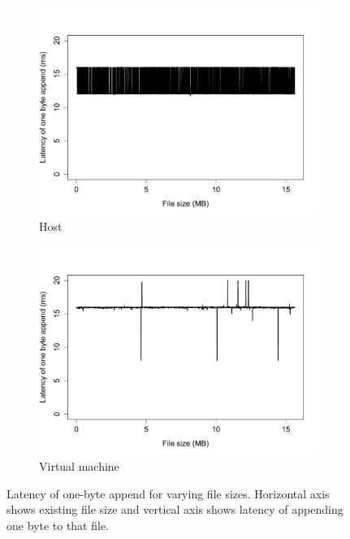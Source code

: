  \begin{figure}[ht!]
    \begin{subfigure}[b]{0.5\textwidth}
		\includegraphics[width=1\textwidth]{./figures/p4_host.pdf}
		\caption{Host}
		\label{fig:p4host}
    \end{subfigure}
    \begin{subfigure}[b]{0.5\textwidth}
		\includegraphics[width=1\textwidth]{./figures/p4_vm.pdf}
		\caption{Virtual machine}
		\label{fig:p4vm}
    \end{subfigure}
	\caption{Latency of one-byte append for varying file sizes. Horizontal axis shows existing file size and vertical axis shows latency of appending one byte to that file.}
	\label{fig:p4}
\end{figure}
